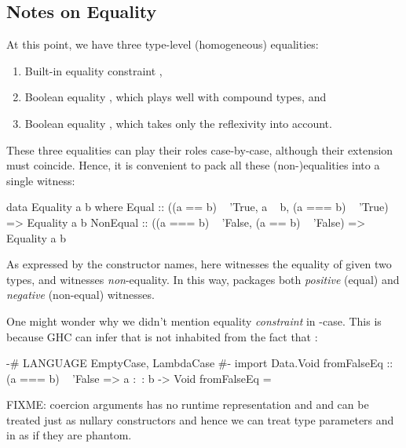 \documentclass[demotion-paper.tex]{subfiles}
\begin{document}
\subsection{Notes on Equality}
At this point, we have three type-level (homogeneous) equalities:
\begin{enumerate}
\item Built-in equality constraint ,
\item Boolean equality , which plays well with compound types, and
\item Boolean equality , which takes only the reflexivity into account.
\end{enumerate}
These three equalities can play their roles case-by-case, although their extension must coincide.
Hence, it is convenient to pack all these (non-)equalities into a single witness:

\begin{code}
data Equality a b where
  Equal :: ((a == b) ~ 'True, a ~ b, (a === b) ~ 'True) => Equality a b
  NonEqual
    :: ((a === b) ~ 'False, (a == b) ~ 'False) => Equality a b
\end{code}

As expressed by the constructor names, here  witnesses the equality of given two types, and  witnesses \emph{non}-equality.
In this way,  packages both \emph{positive} (equal) and \emph{negative} (non-equal) witnesses.

One might wonder why we didn't mention equality \emph{constraint}  in -case.
This is because GHC can infer that  is not inhabited from the fact that :

\begin{code}
{-# LANGUAGE EmptyCase, LambdaCase #-}
import Data.Void
fromFalseEq :: (a === b) ~ 'False => a :~: b -> Void
fromFalseEq = \case {}
\end{code}

FIXME: coercion arguments has no runtime representation and {} and {} can be treated just as nullary constructors and hence we can treat type parameters {} and {} in {} as if they are phantom.
\end{document}
